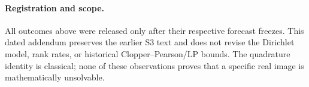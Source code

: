\paragraph{Registration and scope.}
All outcomes above were released only after their
respective forecast freezes. This dated addendum
preserves the earlier S3 text and does not revise
the Dirichlet model, rank rates, or historical
Clopper--Pearson/LP bounds. The quadrature identity
is classical; none of these observations proves that
a specific real image is mathematically unsolvable.
